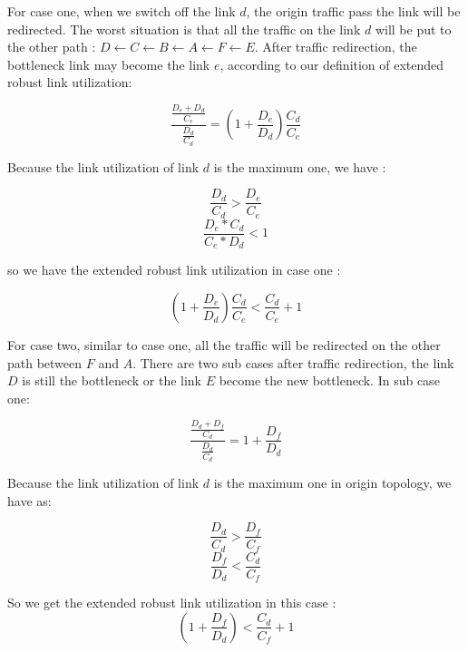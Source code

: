 \documentclass[conference]{IEEEtran}
\begin{document}
For case one, when we switch off the link $d$, the origin traffic pass the link will be redirected. The worst situation
is that all the traffic on the link $d$ will be put to the other path : $D \leftarrow C \leftarrow B \leftarrow A \leftarrow 
F \leftarrow E$. After traffic redirection, the bottleneck link may become the link $e$, according to our definition of
extended robust link utilization:

\begin{equation}
    \frac {\frac{D_e + D_d} {C_e}} {\frac {D_d}{C_d}} = (1 + \frac{D_e}{D_d}) \frac{C_d}{C_e}
\end{equation}

Because the link utilization of link $d$ is the maximum one, we have :

\begin{equation}
    \frac{D_d}{C_d} > \frac{D_e}{C_e} 
\end{equation}
\begin{equation}
    \frac{D_e * C_d}{C_e * D_d} < 1
\end{equation}

so we have the extended robust link utilization in case one :

\begin{equation}
    (1 + \frac{D_e}{D_d}) \frac{C_d}{C_e} < \frac{C_d}{C_e} + 1
\end{equation}


For case two, similar to case one, all the traffic will be redirected on the other path between $F$ and $A$. There are two 
sub cases after traffic redirection, the link $D$ is still the bottleneck or the link $E$ become the new bottleneck. In sub 
case one:

\begin{equation}
    \frac{\frac{D_d + D_f}{C_d}}{\frac{D_d}{C_d}} = 1 + \frac{D_f}{D_d}
\end{equation}

Because the link utilization of link $d$ is the maximum one in origin topology, we have as:

\begin{equation}
    \frac{D_d}{C_d} > \frac{D_f}{C_f} 
\end{equation}
\begin{equation}
    \frac{D_f}{D_d} < \frac{C_d}{C_f} 
\end{equation}

So we get the extended robust link utilization in this case :
\begin{equation}
    (1 + \frac{D_f}{D_d}) < \frac{C_d}{C_f} + 1
\end{equation}
\end{document}

